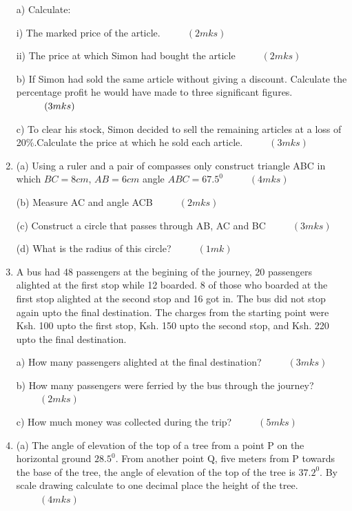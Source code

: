 \documentclass[
  a4paperpaper,
]{scrbook}
\begin{document}
\begin{tcolorbox}
\begin{enumerate}
  a) Calculate:

  i) The marked price of the article. \(\hspace{1cm} (2mks)\)

  ii) The price at which Simon had bought the article
  \(\hspace{1cm} (2mks)\)

  b) If Simon had sold the same article without giving a discount.
  Calculate the percentage profit he would have made to three
  significant figures. \(\hspace{1 cm} (3mks)\)

  c) To clear his stock, Simon decided to sell the remaining articles at
  a loss of 20\%.Calculate the price at which he sold each article.
  \(\hspace{1cm} (3mks)\)
\item
  (a) Using a ruler and a pair of compasses only construct triangle ABC
  in which \(BC = 8cm\), \(AB = 6cm\) angle \(ABC = 67.5^0\)
  \(\hspace{1cm} (4mks)\)

  (b) Measure AC and angle ACB \(\hspace{1cm}(2mks)\)

  (c) Construct a circle that passes through AB, AC and BC
  \(\hspace{1cm} (3mks)\)

  (d) What is the radius of this circle? \(\hspace{1cm} (1mk)\)
\item
  A bus had 48 passengers at the begining of the journey, 20 passengers
  alighted at the first stop while 12 boarded. 8 of those who boarded at
  the first stop alighted at the second stop and 16 got in. The bus did
  not stop again upto the final destination. The charges from the
  starting point were Ksh. 100 upto the first stop, Ksh. 150 upto the
  second stop, and Ksh. 220 upto the final destination.

  a) How many passengers alighted at the final destination?
  \(\hspace{1cm} (3mks)\)

  b) How many passengers were ferried by the bus through the journey?
  \(\hspace{1cm} (2mks)\)

  c) How much money was collected during the trip?
  \(\hspace{1cm} (5mks)\)
\item
  (a) The angle of elevation of the top of a tree from a point P on the
  horizontal ground \(28.5^0\). From another point Q, five meters from P
  towards the base of the tree, the angle of elevation of the top of the
  tree is \(37.2^0\). By scale drawing calculate to one decimal place
  the height of the tree.\(\hspace{1cm} (4mks)\)


\end{enumerate}
\end{tcolorbox}
\end{document}
